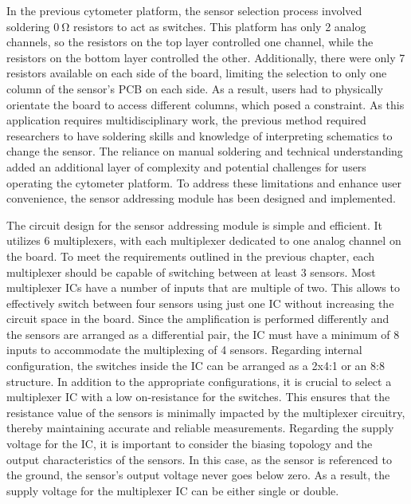 
In the previous cytometer platform, the sensor selection process involved soldering $\mathrm{0~\Omega}$ resistors to act as switches. This platform has only 2 analog channels, so the resistors on the top layer controlled one channel, while the resistors on the bottom layer controlled the other. Additionally, there were only 7 resistors available on each side of the board, limiting the selection to only one column of the sensor's \ac{PCB} on each side. As a result, users had to physically orientate the board to access different columns, which posed a constraint. As this application requires multidisciplinary work, the previous method required researchers to have soldering skills and knowledge of interpreting schematics to change the sensor. The reliance on manual soldering and technical understanding added an additional layer of complexity and potential challenges for users operating the cytometer platform. To address these limitations and enhance user convenience, the sensor addressing module has been designed and implemented.

The circuit design for the sensor addressing module is simple and efficient. It utilizes 6 multiplexers, with each multiplexer dedicated to one analog channel on the board. To meet the requirements outlined in the previous chapter, each multiplexer should be capable of switching between at least 3 sensors. Most multiplexer \ac{IC}s have a number of inputs that are multiple of two. This allows to effectively switch between four sensors using just one \ac{IC} without increasing the circuit space in the board. Since the amplification is performed differently and the sensors are arranged as a differential pair, the \ac{IC} must have a minimum of 8 inputs to accommodate the multiplexing of 4 sensors. Regarding internal configuration, the switches inside the \ac{IC} can be arranged as a 2x4:1 or an 8:8 structure. In addition to the appropriate configurations, it is crucial to select a multiplexer \ac{IC} with a low on-resistance for the switches. This ensures that the resistance value of the sensors is minimally impacted by the multiplexer circuitry, thereby maintaining accurate and reliable measurements. Regarding the supply voltage for the \ac{IC}, it is important to consider the biasing topology and the output characteristics of the sensors. In this case, as the sensor is referenced to the ground, the sensor's output voltage never goes below zero. As a result, the supply voltage for the multiplexer \ac{IC} can be either single or double.

